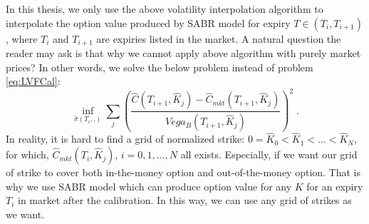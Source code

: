 \documentclass[letterpaper,12pt,titlepage,oneside,final]{book}
\numberwithin{equation}{section}
\theoremstyle{definition}
\begin{document}
In this thesis, we only use the above volatility interpolation algorithm to interpolate the option value produced by SABR model for expiry $T \in (T_i,T_{i+1})$, where $T_i$ and $T_{i+1}$ are expiries listed in the market. 
A natural question the reader may ask is that why  we cannot apply above algorithm with purely market prices? In other words, we solve the below problem instead of problem \eqref{eq:LVFCal}:
\[
	\inf_{\widehat{\sigma}(T_i,.)} \sum_{j}(\frac{\widehat{C}(T_{i+1},\widehat{K}_j)-\widehat{C}_{mkt}(T_{i+1},\widehat{K}_j)}{Vega_{B}(T_{i+1},\widehat{K}_j)})^2 \;.
\]
In reality, it is hard to find a grid of normalized strike: $0=\widehat{K}_0<\widehat{K}_1<\dots<\widehat{K}_{N}$, for which,  $\widehat{C}_{mkt}(T_{i},\widehat{K}_j)$, $i=0,1,\dots,N$ all exists.
Especially, if we want our grid of strike to cover both in-the-money option and out-of-the-money option. That is why we use SABR model  which can produce option value for any $K$ for an expiry $T_i$ in market after the calibration. In this way, we can use any grid of strikes as we want.
\end{document}
